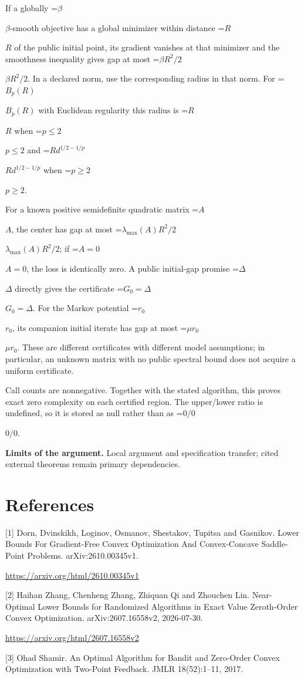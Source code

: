 \documentclass[10pt,a4paper]{article}
\newcommand{\AtlasMath}[1]{\par\begingroup\centering\setbox0=\hbox{$\displaystyle #1$}\ifdim\wd0>1.4\linewidth\typeout{ATLAS WIDE FORMULA: \the\wd0}\fi\ifdim\wd0>\linewidth\resizebox{\linewidth}{!}{\box0}\else\box0\fi\par\endgroup}
\newcommand{\AtlasInlineMath}[1]{\begingroup\setbox0=\hbox{$#1$}\ifdim\wd0>.4\linewidth\endgroup\AtlasMath{#1}\else\endgroup$#1$\fi}
\begin{document}
If a globally \AtlasInlineMath{\beta}-smooth objective has a global minimizer within distance \AtlasInlineMath{R} of the public initial point, its gradient vanishes at that minimizer and the smoothness inequality gives gap at most \AtlasInlineMath{\beta R^2/2}. In a declared norm, use the corresponding radius in that norm. For \AtlasInlineMath{B_p(R)} with Euclidean regularity this radius is \AtlasInlineMath{R} when \AtlasInlineMath{p\le2} and \AtlasInlineMath{R d^{1/2-1/p}} when \AtlasInlineMath{p\ge2}.

For a known positive semidefinite quadratic matrix \AtlasInlineMath{A}, the center has gap at most \AtlasInlineMath{\lambda_{\max}(A)R^2/2}; if \AtlasInlineMath{A=0}, the loss is identically zero. A public initial-gap promise \AtlasInlineMath{\Delta} directly gives the certificate \AtlasInlineMath{G_0=\Delta}. For the Markov potential \AtlasInlineMath{r_0}, its companion initial iterate has gap at most \AtlasInlineMath{\mu r_0}. These are different certificates with different model assumptions; in particular, an unknown matrix with no public spectral bound does not acquire a uniform certificate.

Call counts are nonnegative. Together with the stated algorithm, this proves exact zero complexity on each certified region. The upper/lower ratio is undefined, so it is stored as null rather than as \AtlasInlineMath{0/0}.

\textbf{Limits of the argument.} Local argument and specification transfer; cited external theorems remain primary dependencies.

\section{References}
[1] Dorn, Dvinskikh, Loginov, Osmanov, Shestakov, Tupitsa and Gasnikov. Lower Bounds For Gradient-Free Convex Optimization And Convex-Concave Saddle-Point Problems. arXiv:2610.00345v1.

\url{https://arxiv.org/html/2610.00345v1}

[2] Haihan Zhang, Chenheng Zhang, Zhiquan Qi and Zhouchen Lin. Near-Optimal Lower Bounds for Randomized Algorithms in Exact Value Zeroth-Order Convex Optimization. arXiv:2607.16558v2, 2026-07-30.

\url{https://arxiv.org/html/2607.16558v2}

[3] Ohad Shamir. An Optimal Algorithm for Bandit and Zero-Order Convex Optimization with Two-Point Feedback. JMLR 18(52):1--11, 2017.
\end{document}
